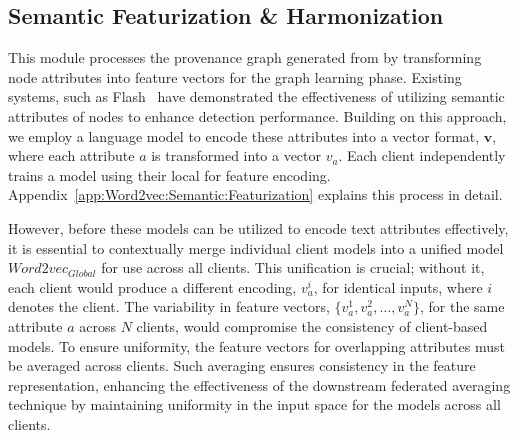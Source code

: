 






\subsection{Semantic Featurization \& Harmonization}
\label{semanfeat}

This module processes the provenance graph generated from \logs by transforming node attributes into feature vectors for the graph learning phase. Existing systems, such as Flash~\cite{flash2024} have demonstrated the effectiveness of utilizing semantic attributes of nodes to enhance detection performance. Building on this approach, we employ a \wordvec language model to encode these attributes into a vector format, \(\mathbf{v}\), where each attribute \(a\) is transformed into a vector \(v_a\). Each client independently trains a \wordvec model using their local \logs for feature encoding. Appendix~\ref{app:Word2vec:Semantic:Featurization} explains this process in detail.

However, before these models can be utilized to encode text attributes effectively, it is essential to contextually merge individual client \wordvec models into a unified model \( Word2vec_{Global} \) for use across all clients. This unification is crucial; without it, each client would produce a different encoding, \(v_a^i\), for identical inputs, where \(i\) denotes the client. The variability in feature vectors, \(\{v_a^1, v_a^2, \ldots, v_a^N\}\), for the same attribute \(a\) across \(N\) clients, would compromise the consistency of client-based \gnnshort models. To ensure uniformity, the feature vectors for overlapping attributes must be averaged across clients. Such averaging ensures consistency in the feature representation, enhancing the effectiveness of the downstream federated averaging technique by maintaining uniformity in the input space for the \gnnshort models across all clients.

